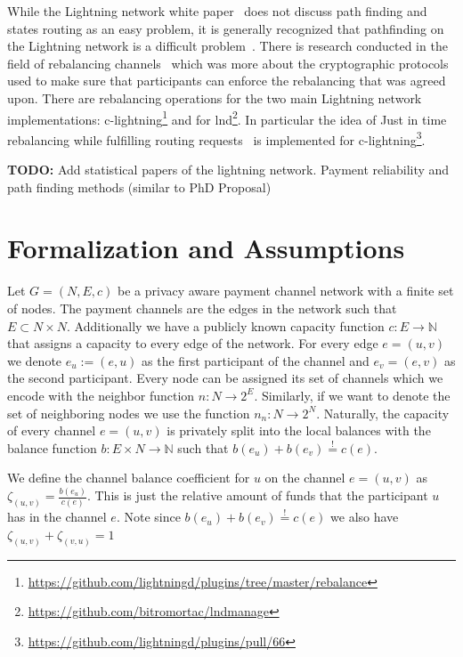 \documentclass[a4paper]{paper}
\begin{document}
While the Lightning network white paper~\cite{poon2016bitcoin} does not discuss path finding and states routing as an easy problem, it is generally recognized that pathfinding on the Lightning network is a difficult problem~\cite{piatkivskyi2018split, prihodko2016flare, bagaria2019boomerang, pickhardt2019pathfinding, grunspan2018ant, sivaraman2018routing}.
There is research conducted in the field of rebalancing channels~\cite{khalil2017revive} which was more about the cryptographic protocols used to make sure that participants can enforce the rebalancing that was agreed upon.
There are rebalancing operations for the two main Lightning network implementations: c-lightning\footnote{\url{https://github.com/lightningd/plugins/tree/master/rebalance}} and for lnd\footnote{\url{https://github.com/bitromortac/lndmanage}}.
In particular the idea of Just in time rebalancing while fulfilling routing requests~\cite{pickhardt2019jit} is implemented for c-lightning\footnote{\url{https://github.com/lightningd/plugins/pull/66}}. 

\textbf{TODO:} Add statistical papers of the lightning network. Payment reliability and path finding methods (similar to PhD Proposal)


\section{Formalization and Assumptions}
\label{sec:formalization}

Let $G=(N,E,c)$ be a privacy aware payment channel network with a finite set of nodes.
The payment channels are the edges in the network such that $E\subset N\times N$.
Additionally we have a publicly known capacity function $c: E\longrightarrow \mathbb{N}$ that assigns a capacity to every edge of the network.
For every edge $e=(u,v)$ we denote $e_u:=(e,u)$ as the first participant of the channel and $e_v=(e,v)$ as the second participant.
Every node can be assigned its set of channels which we encode with the neighbor function $n : N \longrightarrow 2^{E}$.
Similarly, if we want to denote the set of neighboring nodes we use the function $n_n : N \longrightarrow 2^{N}$.
Naturally, the capacity of every channel $e=(u,v)$ is privately split into the local balances with the balance function $b: E\times N\longrightarrow\mathbb{N}$ such that $b(e_u)+b(e_v)\stackrel{!}{=}c(e)$.

We define the channel balance coefficient for $u$ on the channel $e=(u,v)$ as  $\zeta_{(u,v)} = \frac{b(e_u)}{c(e)}$.
This is just the relative amount of funds that the participant $u$ has in the channel $e$.
Note since $b(e_u)+b(e_v)\stackrel{!}{=}c(e)$ we also have $\zeta_{(u,v)} + \zeta_{(v,u)}=1$
\end{document}
